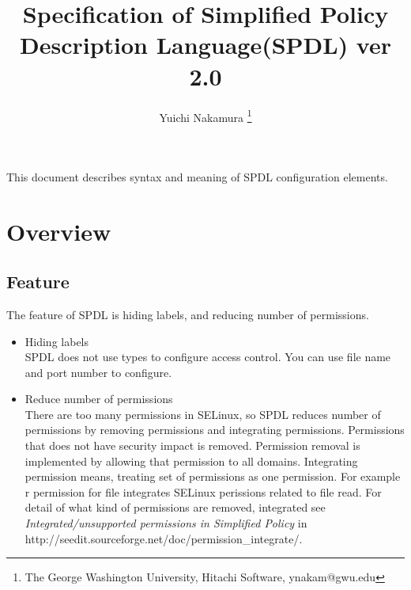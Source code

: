 \documentclass{article}
\title{Specification of Simplified Policy Description Language(SPDL) ver 2.0}
\author{Yuichi Nakamura \thanks{The George Washington University, Hitachi Software, ynakam@gwu.edu}}
\begin{document}
\maketitle
\tableofcontents
\newpage
This document describes syntax and meaning of SPDL configuration elements.



\section{Overview}
\subsection{Feature}
The feature of SPDL is hiding labels, and reducing number of
permissions.
\begin{itemize}
 \item Hiding labels\\
       SPDL does not use types to configure access control. You can use
       file name and port number to configure.
 \item Reduce number of permissions\\
       There are too many permissions in SELinux, so SPDL reduces number
       of permissions by removing permissions and integrating
       permissions.
       Permissions that does not have security impact is
       removed. Permission removal is implemented by allowing that
       permission to all domains. Integrating permission means, treating
       set of permissions as one permission. For example r permission
       for file integrates SELinux perissions related to file read.
       For detail of what kind of permissions are removed, integrated  see {\it
       Integrated/unsupported permissions in Simplified Policy } in
       http://seedit.sourceforge.net/doc/permission\_integrate/.
\end{itemize}
\end{document}
